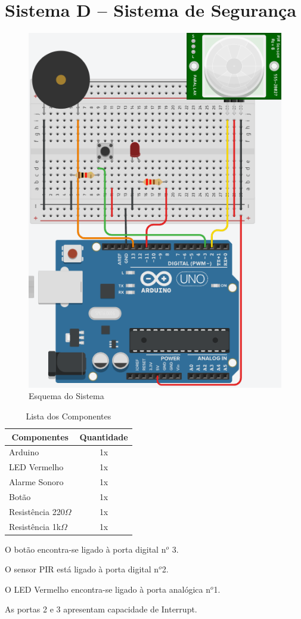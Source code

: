 \newpage\section{Sistema D – Sistema de Segurança}


\begin{figure}[H]
    \centering
    \includegraphics[scale=0.6,angle=-90]{images/hardware/sisD_tinkercad.png}
    \caption{Esquema do Sistema}
\end{figure}

\begin{table}[H]
    \centering
    \setlength{\arrayrulewidth}{0.5mm}
    \renewcommand{\arraystretch}{1.5}
    \begin{tabular}{|l|c|}
        \hline
        \multicolumn{1}{|c|}{Componentes} & \multicolumn{1}{|c|}{Quantidade}\\ [0.8ex] 
        \hline
        Arduino & 1x\\
        \hline
        LED Vermelho & 1x\\
        \hline
        Alarme Sonoro & 1x\\
        \hline
        Botão & 1x\\
        \hline
        Resistência 220$\Omega$ & 1x\\
        \hline
        Resistência 1k$\Omega$ & 1x\\
        \hline
    \end{tabular}
    \caption{Lista dos Componentes}
\end{table}

O botão encontra-se ligado à porta digital n$^{o}$ 3.

O sensor PIR está ligado à porta digital n$^{o}$2.

O LED Vermelho encontra-se ligado à porta analógica n$^{o}$1.

As portas 2 e 3 apresentam capacidade de Interrupt.